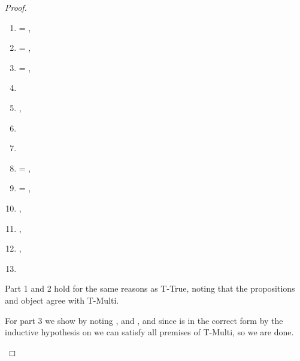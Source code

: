 \begin{lemma}
\begin{proof}
\begin{case}[B-DefMethod]
\begin{itemize}
\begin{subcase}[T-DefMethod]
\begin{enumerate}[resume]
          \item
  \ep{} = { {} {}},
          \item
   = {\ArrowOne {\x{}} {} {\s{}}
                     {
                                 {}}
                     {}},
          \item
   = {\ArrowOne {\x{}} {} {\sp{}}
                     {
                                 {}}
                     {}},
          \item
\judgementtworewrite {\propenv{}}
                  {} { {}}
                  {}
          \item
  ,
          \item
\judgementtworewrite {\propenv{}}
           {} {}
           {}
          \item
           {} {\s{}}
           {
                       {}}
           {}
           {}
          \item
  \e{} = { {} {}},
          \item
   = {\abs {\x{}} {} {}},
\item
  ,
\item
  \inpropenv{\topprop{}}{\thenprop{\prop{}}},
\item
  \inpropenv{\botprop{}}{\elseprop{\prop{}}},
\item
  \issubobjin{}{\emptyobject{}}{\object{}}
        \end{enumerate}

                                Part 1 and 2 hold for the same reasons as T-True, noting that the propositions
                                and object agree with T-Multi.

For part 3 we show
by noting \judgementtwo {} {} {},
  and
  , and since \disptable{} is in the correct form by the inductive
  hypothesis on {} we can satisfy all premises of T-Multi, so we are done.



\end{subcase}
\end{itemize}
\end{case}
\end{proof}
\end{lemma}
